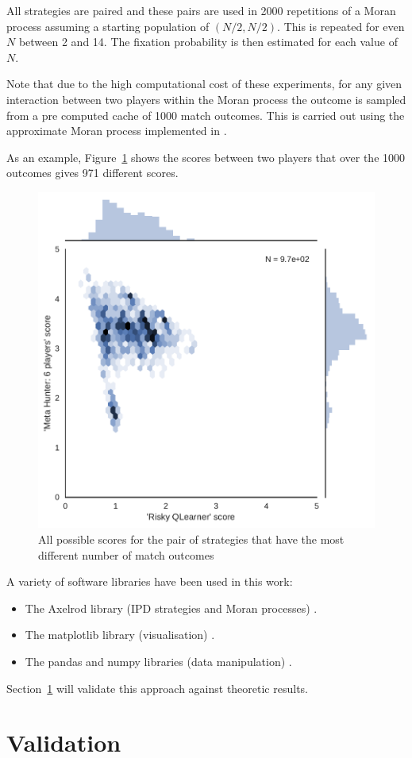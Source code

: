 \documentclass{article}
\begin{document}
All strategies are paired and these pairs are used in 2000 repetitions of a
Moran process assuming a starting population of \((N/2, N/2)\). This is repeated
for even \(N\) between 2 and 14. The fixation probability is then estimated for
each value of \(N\).

Note that due to the high computational cost of these experiments, for any given
interaction between two players within the Moran process the outcome is sampled
from a pre computed cache of 1000 match outcomes. This is carried out using the
approximate Moran process implemented in \cite{axelrodproject}.

As an example, Figure~\ref{fig:players_with_most_scores} shows the scores
between two players that over the 1000 outcomes gives 971 different scores.

\begin{figure}[!htbp]
    \centering
    \includegraphics[width=.4\textwidth]{../img/players_with_most_scores.pdf}
    \caption{All possible scores for the pair of strategies that have the most
    different number of match outcomes}
    \label{fig:players_with_most_scores}
\end{figure}

A variety of software libraries have been used in this work:

\begin{itemize}
    \item The Axelrod library (IPD strategies and Moran processes)
        \cite{axelrodproject}.
    \item The matplotlib library (visualisation) \cite{hunter2007matplotlib}.
    \item The pandas and numpy libraries (data manipulation)
        \cite{mckinney2010data, walt2011numpy}.
\end{itemize}

Section~\ref{sec:validation} will validate this approach against theoretic
results.

\section{Validation}\label{sec:validation}
\end{document}
